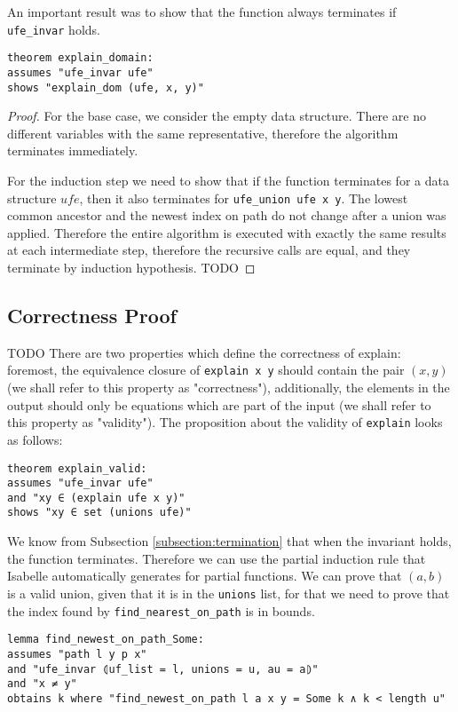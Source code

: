 An important result was to show that the function always terminates if \lstinline{ufe_invar} holds.

\begin{lstlisting}
theorem explain_domain:
assumes "ufe_invar ufe"
shows "explain_dom (ufe, x, y)"
\end{lstlisting}

\begin{proof}
For the base case, we consider the empty data structure. There are no different variables with the same representative, therefore the algorithm terminates immediately.

For the induction step we need to show that if the function terminates for a data structure $ufe$, then it also terminates for \lstinline{ufe_union ufe x y}.
The lowest common ancestor and the newest index on path do not change after a union was applied. Therefore the entire algorithm is executed with exactly the same results at each intermediate step, therefore the recursive calls are equal, and they terminate by induction hypothesis.
TODO
\end{proof}

\subsection{Correctness Proof}
TODO
There are two properties which define the correctness of explain: foremost, the equivalence closure of \lstinline{explain x y} should contain the pair $(x, y)$ (we shall refer to this property as "correctness"), additionally, the elements in the output should only be equations which are part of the input (we shall refer to this property as "validity"). The proposition about the validity of \lstinline{explain} looks as follows:

\begin{lstlisting}
theorem explain_valid:
assumes "ufe_invar ufe"
and "xy ∈ (explain ufe x y)"
shows "xy ∈ set (unions ufe)"
\end{lstlisting}

We know from Subsection \ref{subsection:termination} that when the invariant holds, the function terminates. Therefore we can use the partial induction rule that Isabelle automatically generates for partial functions. We can prove that $(a, b)$ is a valid union, given that it is in the \lstinline{unions} list, for that we need to prove that the index found by \lstinline{find_nearest_on_path} is in bounds.

\begin{lstlisting}
lemma find_newest_on_path_Some:
assumes "path l y p x"
and "ufe_invar ⦇uf_list = l, unions = u, au = a⦈"
and "x ≠ y"
obtains k where "find_newest_on_path l a x y = Some k ∧ k < length u"
\end{lstlisting}

